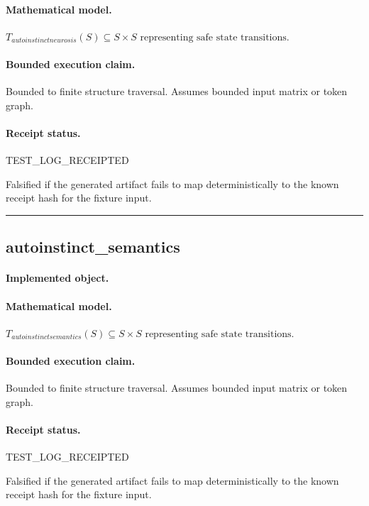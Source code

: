 \paragraph{Mathematical model.} $T_{autoinstinctneurosis}(S) \subseteq S \times S \text{ representing safe state transitions}.$
\paragraph{Bounded execution claim.} Bounded to finite structure traversal. Assumes bounded input matrix or token graph.
\paragraph{Receipt status.} TEST\_LOG\_RECEIPTED
\begin{falsifier}
Falsified if the generated artifact fails to map deterministically to the known receipt hash for the fixture input.
\end{falsifier}

\vspace{1em}\hrule\vspace{1em}
\subsection{autoinstinct\_semantics}
\paragraph{Implemented object.} 
\paragraph{Mathematical model.} $T_{autoinstinctsemantics}(S) \subseteq S \times S \text{ representing safe state transitions}.$
\paragraph{Bounded execution claim.} Bounded to finite structure traversal. Assumes bounded input matrix or token graph.
\paragraph{Receipt status.} TEST\_LOG\_RECEIPTED
\begin{falsifier}
Falsified if the generated artifact fails to map deterministically to the known receipt hash for the fixture input.
\end{falsifier}

